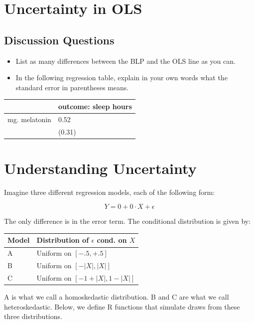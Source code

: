 \documentclass[
]{book}
\providecommand{\tightlist}{%
  \setlength{\itemsep}{0pt}\setlength{\parskip}{0pt}}
\theoremstyle{definition}
\theoremstyle{definition}
\theoremstyle{definition}
\theoremstyle{definition}
\theoremstyle{remark}
\begin{document}
\hypertarget{uncertainty-in-ols}{%
\section{Uncertainty in OLS}\label{uncertainty-in-ols}}

\hypertarget{discussion-questions-2}{%
\subsection{Discussion Questions}\label{discussion-questions-2}}

\begin{itemize}
\tightlist
\item
  List as many differences between the BLP and the OLS line as you can.
\item
  In the following regression table, explain in your own words what the standard error in parentheses means.
\end{itemize}

\begin{longtable}[]{@{}ll@{}}
\toprule
& outcome: sleep hours \\
\midrule
\endhead
mg. melatonin & 0.52 \\
& (0.31) \\
\bottomrule
\end{longtable}

\hypertarget{understanding-uncertainty}{%
\section{Understanding Uncertainty}\label{understanding-uncertainty}}

Imagine three different regression models, each of the following form:

\[
  Y = 0 + 0 \cdot X + \epsilon
\]

The only difference is in the error term. The conditional distribution is given by:

\begin{longtable}[]{@{}ll@{}}
\toprule
Model & Distribution of \(\epsilon\) cond. on \(X\) \\
\midrule
\endhead
A & Uniform on \([-.5, +.5]\) \\
B & Uniform on \([ - |X|, |X| ]\) \\
C & Uniform on \([ -1 + |X|, 1- |X| ]\) \\
\bottomrule
\end{longtable}

A is what we call a homoskedastic distribution. B and C are what we call heteroskedastic. Below, we define R functions that simulate draws from these three distributions.
\end{document}
